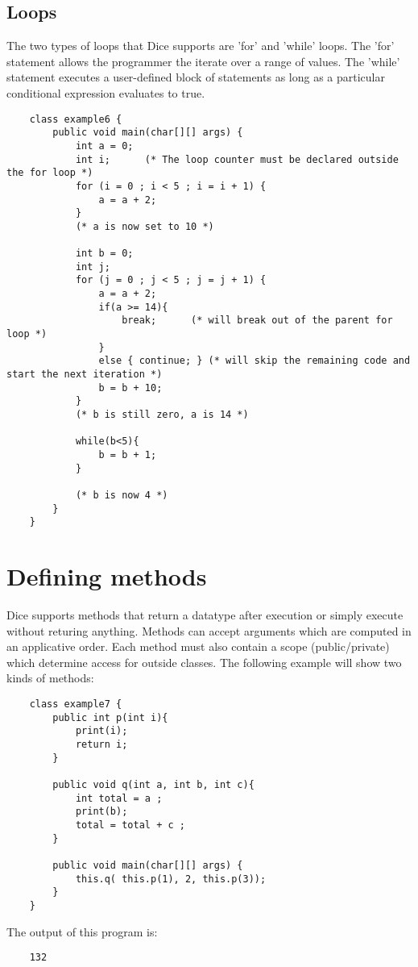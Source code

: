 \begin{homeworkProblem}
	\subsection{Loops}
	The two types of loops that Dice supports are 'for' and 'while' loops. The ’for’ statement allows the programmer the iterate over a range of values. The ’while’ statement executes a user-defined block of statements as long as a particular conditional expression evaluates to true.
	\begin{verbatim}
	class example6 {
		public void main(char[][] args) {
			int a = 0;
			int i;		(* The loop counter must be declared outside the for loop *)
	 		for (i = 0 ; i < 5 ; i = i + 1) {
	 	    	a = a + 2;
	 		}
	 		(* a is now set to 10 *)

	 		int b = 0;
	 		int j;
	 		for (j = 0 ; j < 5 ; j = j + 1) {
	 			a = a + 2;
	 	    	if(a >= 14){    
	 	    		break;		(* will break out of the parent for loop *)
	 	    	}
	 	    	else { continue; } (* will skip the remaining code and start the next iteration *)
	 	    	b = b + 10;
	 		}
	 		(* b is still zero, a is 14 *)

	 		while(b<5){
	 			b = b + 1;
	 		}

	 		(* b is now 4 *)
		}
	}
	\end{verbatim}
	\section{Defining methods}
	Dice supports methods that return a datatype after execution or simply execute without returing anything. Methods can accept arguments which are computed in an applicative order. Each method must also contain a scope (public/private) which determine access for outside classes. The following example will show two kinds of methods:
	\begin{verbatim}
	class example7 {
		public int p(int i){ 
			print(i); 
			return i; 
		}

		public void q(int a, int b, int c){ 
			int total = a ; 
			print(b); 
			total = total + c ; 
		}
		
		public void main(char[][] args) {
			this.q( this.p(1), 2, this.p(3));
		}
	}
	\end{verbatim}
	The output of this program is: 
	\begin{verbatim}
	132
	\end{verbatim}


\end{homeworkProblem}
